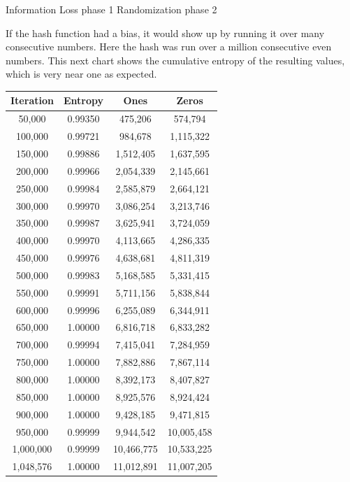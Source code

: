 \documentclass[letterpaper]{article}
\begin{document}
\begin{multicols}{2}
\begin{center}
\vspace{0.5cm}

\begin{minipage}{0.8\textwidth}
\raggedright
Information Loss phase 1
Randomization phase 2
\end{minipage}
\end{center}

If the hash function had a bias, it would show up by running it over many consecutive numbers. Here the hash was run over a million consecutive even numbers. This next chart shows the cumulative entropy of the resulting values, which is very near one as expected.

\begin{center}
\begin{tabular}{|c|c|c|c|}
\hline
\textbf{Iteration} & \textbf{Entropy} & \textbf{Ones} & \textbf{Zeros} \\
\hline
50,000 & 0.99350 & 475,206 & 574,794 \\
100,000 & 0.99721 & 984,678 & 1,115,322 \\
150,000 & 0.99886 & 1,512,405 & 1,637,595 \\
200,000 & 0.99966 & 2,054,339 & 2,145,661 \\
250,000 & 0.99984 & 2,585,879 & 2,664,121 \\
300,000 & 0.99970 & 3,086,254 & 3,213,746 \\
350,000 & 0.99987 & 3,625,941 & 3,724,059 \\
400,000 & 0.99970 & 4,113,665 & 4,286,335 \\
450,000 & 0.99976 & 4,638,681 & 4,811,319 \\
500,000 & 0.99983 & 5,168,585 & 5,331,415 \\
550,000 & 0.99991 & 5,711,156 & 5,838,844 \\
600,000 & 0.99996 & 6,255,089 & 6,344,911 \\
650,000 & 1.00000 & 6,816,718 & 6,833,282 \\
700,000 & 0.99994 & 7,415,041 & 7,284,959 \\
750,000 & 1.00000 & 7,882,886 & 7,867,114 \\
800,000 & 1.00000 & 8,392,173 & 8,407,827 \\
850,000 & 1.00000 & 8,925,576 & 8,924,424 \\
900,000 & 1.00000 & 9,428,185 & 9,471,815 \\
950,000 & 0.99999 & 9,944,542 & 10,005,458 \\
1,000,000 & 0.99999 & 10,466,775 & 10,533,225 \\
1,048,576 & 1.00000 & 11,012,891 & 11,007,205 \\
\hline
\end{tabular}
\end{center}


\end{multicols}
\end{document}
